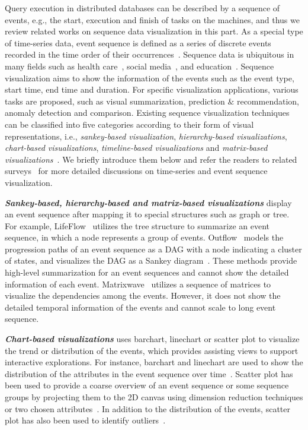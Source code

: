 Query execution in distributed databases can be described by a sequence of events, e.g., the start, execution and finish of tasks on the machines, and thus we review related works on sequence data visualization in this part. As a special type of time-series data, event sequence is defined as a series of discrete events recorded in the time order of their occurrences~\cite{guo2020survey}. Sequence data is ubiquitous in many fields such as health care~\cite{malik2015cohort, wongsuphasawat2011outflow}, social media~\cite{zhao2014fluxflow, law2018maqui}, and education~\cite{chen2015peakvizor, mu2019moocad, goulden2019ccvis, he2019vuc, chen2018viseq}. Sequence visualization aims to show the information of the events such as the event type, start time, end time and duration. For specific visualization applications, various tasks are proposed, such as visual summarization, prediction $\&$ recommendation, anomaly detection and comparison. Existing sequence visualization techniques can be classified into five categories according to their form of visual representations, i.e., \emph{sankey-based visualization}, \emph{hierarchy-based visualizations}, \emph{chart-based visualizations}, \emph{timeline-based visualizations} and \emph{matrix-based visualizations}~\cite{guo2020survey}. We briefly introduce them below and refer the readers to related surveys~\cite{guo2020survey, silva2000visualization} for more detailed discussions on time-series and event sequence visualization. 



\emph{\textbf{Sankey-based, hierarchy-based and matrix-based visualizations}} display an event sequence after mapping it to special structures such as graph or tree.
For example, LifeFlow~\cite{wongsuphasawat2011lifeflow} utilizes the tree structure to summarize an event sequence, in which a node represents a group of events. Outflow~\cite{wongsuphasawat2011outflow} models the progression paths of an event sequence as a DAG with a node indicating a cluster of states, and visualizes the DAG as a Sankey diagram~\cite{riehmann2005interactive}. These methods provide high-level summarization for an event sequences and cannot show the detailed information of each event. Matrixwave~\cite{zhao2015matrixwave} utilizes a sequence of matrices to visualize the dependencies among the events. However, it does not show the detailed temporal information of the events and cannot scale to long event sequence. 

\emph{\textbf{Chart-based visualizations}} uses barchart, linechart or scatter plot to visualize the trend or distribution of the events, which provides assisting views to support interactive explorations. For instance, barchart and linechart are used to show the distribution of the attributes in the event sequence over time~\cite{gotz2019visual, cappers2017exploring}. Scatter plot has been used to provide a coarse overview of an event sequence or some sequence groups by projecting them to the 2D canvas using dimension reduction techniques or two chosen attributes~\cite{wu2020visual, malik2016high, gotz2019visual}. In addition to the distribution of the events, scatter plot has also been used to identify outliers~\cite{}. 

